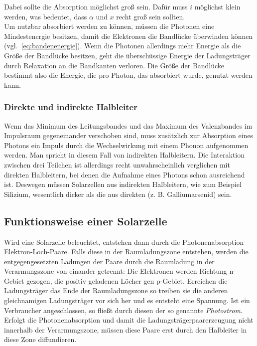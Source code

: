 \documentclass[slug=SZ, room=Hermann-Krone-Bau\,\ Labor\ 1.25, supervisor=Martin\ Kroll]{../../Lab_Report_LaTeX/lab_report}
\begin{document}
Dabei sollte die Absorption möglichst groß sein. Dafür muss \(i\) möglichst klein werden, was bedeutet, dass
\(\alpha\) und \(x\) recht groß sein sollten.\\

Um nutzbar absorbiert werden zu können, müssen die Photonen eine Mindestenergie besitzen, damit die Elektronen
die Bandlücke überwinden können (vgl.~\ref{eq:bandenenergie}). Wenn die Photonen allerdings mehr Energie als
die Größe der Bandlücke besitzen, geht die überschüssige Energie der Ladungsträger durch Relaxation an die
Bandkanten verloren. Die Größe der Bandlücke bestimmt also die Energie, die pro Photon, das absorbiert wurde,
genutzt werden kann.

\subsubsection{Direkte und indirekte Halbleiter}
\label{sec:dirindhalb}

Wenn das Minimum des Leitungsbandes und das Maximum des Valenzbandes im Impulsraum gegeneinander verschoben sind,
muss zusätzlich zur Absorption eines Photons ein Impuls durch die Wechselwirkung mit einem Phonon aufgenommen
werden. Man spricht in diesem Fall von indirekten Halbleitern. Die Interaktion zwischen drei Teilchen ist
allerdings recht unwahrscheinlich verglichen mit direkten Halbleitern, bei denen die Aufnahme eines Photons schon
ausreichend ist.
Deswegen müssen Solarzellen aus indirekten Halbleitern, wie zum Beispiel Silizium, wesentlich dicker als die
aus direkten (z. B. Galliumarsenid) sein.

\subsection{Funktionsweise einer Solarzelle}
\label{sec:solar}

Wird eine Solarzelle beleuchtet, entstehen dann durch die Photonenabsorption Elektron-Loch-Paare. Falls diese in der
Raumladungszone entstehen, werden die entgegengesetzten Ladungen der Paare durch die Raumladung in der
Verarmungszone von einander getrennt:
Die Elektronen werden Richtung n-Gebiet gezogen, die positiv geladenen Löcher gen p-Gebiet.
Erreichen die Ladungsträger das Ende der Raumladungszone so treiben sie die anderen gleichnamigen Ladungsträger
vor sich her und es entsteht eine Spannung. Ist ein Verbraucher angeschlossen, so fließt durch diesen der so genannte \emph{Photostrom}.
Erfolgt die Photonenabsorption und damit die Ladungsträgerpaarerzeugung nicht innerhalb der Verarmungszone,
müssen diese Paare erst durch den Halbleiter in diese Zone diffundieren.
\end{document}
